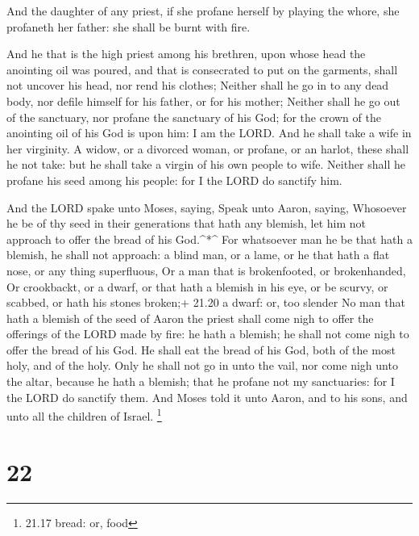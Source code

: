  And the daughter of any priest, if she profane herself by
playing the whore, she profaneth her father: she shall be burnt with
fire.

 And he that is the high priest among his brethren, upon
whose head the anointing oil was poured, and that is consecrated to put
on the garments, shall not uncover his head, nor rend his clothes;
 Neither shall he go in to any dead body, nor defile
himself for his father, or for his mother;  Neither shall
he go out of the sanctuary, nor profane the sanctuary of his God; for
the crown of the anointing oil of his God is upon him: I am the LORD.
 And he shall take a wife in her virginity.  A
widow, or a divorced woman, or profane, or an harlot, these shall he not
take: but he shall take a virgin of his own people to wife.
 Neither shall he profane his seed among his people: for I
the LORD do sanctify him.

 And the LORD spake unto Moses, saying,  Speak
unto Aaron, saying, Whosoever he be of thy seed in their generations
that hath any blemish, let him not approach to offer the bread of his
God.\^{}*\^{}  For whatsoever man he be that hath a
blemish, he shall not approach: a blind man, or a lame, or he that hath
a flat nose, or any thing superfluous,  Or a man that is
brokenfooted, or brokenhanded,  Or crookbackt, or a dwarf,
or that hath a blemish in his eye, or be scurvy, or scabbed, or hath his
stones broken;+ 21.20 a dwarf: or, too slender  No man that
hath a blemish of the seed of Aaron the priest shall come nigh to offer
the offerings of the LORD made by fire: he hath a blemish; he shall not
come nigh to offer the bread of his God.  He shall eat the
bread of his God, both of the most holy, and of the holy. 
Only he shall not go in unto the vail, nor come nigh unto the altar,
because he hath a blemish; that he profane not my sanctuaries: for I the
LORD do sanctify them.  And Moses told it unto Aaron, and
to his sons, and unto all the children of Israel. \footnote{21.17 bread:
  or, food}

\hypertarget{section-21}{%
\section{22}\label{section-21}}

